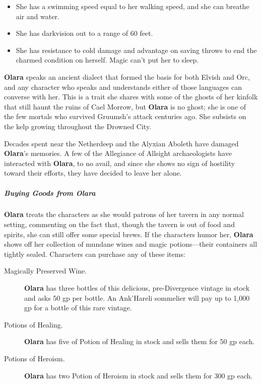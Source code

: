 \documentclass[10pt,a4paper,twoside,fancy,bg=print,twocolumn,openany,nodeprecatedcode]{dndbook}
\begin{document}
\begin{itemize}
\item She has a swimming speed equal to her walking speed, and she can breathe air and water.
\item She has darkvision out to a range of 60 feet.
\item She has resistance to cold damage and advantage on saving throws to end the charmed condition on herself. Magic can't put her to sleep.
\end{itemize}

\textbf{Olara} speaks an ancient dialect that formed the basis for both Elvish and Orc, and any character who speaks and understands either of those languages can converse with her. This is a trait she shares with some of the ghosts of her kinfolk that still haunt the ruins of Cael Morrow, but \textbf{Olara} is no ghost; she is one of the few mortals who survived Gruumsh's attack centuries ago. She subsists on the kelp growing throughout the Drowned City.

Decades spent near the Netherdeep and the Alyxian Aboleth have damaged \textbf{Olara}'s memories. A few of the Allegiance of Allsight archaeologists have interacted with \textbf{Olara}, to no avail, and since she shows no sign of hostility toward their efforts, they have decided to leave her alone.

\subparagraph{Buying Goods from Olara}
\textbf{Olara} treats the characters as she would patrons of her tavern in any normal setting, commenting on the fact that, though the tavern is out of food and spirits, she can still offer some special brews. If the characters humor her, \textbf{Olara} shows off her collection of mundane wines and magic potions—their containers all tightly sealed. Characters can purchase any of these items:


\begin{description}
\item[Magically Preserved Wine.]
\textbf{Olara} has three bottles of this delicious, pre-Divergence vintage in stock and asks 50 gp per bottle. An Ank'Hareli sommelier will pay up to 1,000 gp for a bottle of this rare vintage.
\item[Potions of Healing.]
\textbf{Olara} has five of Potion of Healing in stock and sells them for 50 gp each.
\item[Potions of Heroism.]
\textbf{Olara} has two Potion of Heroism in stock and sells them for 300 gp each.
\end{description}
\end{document}
